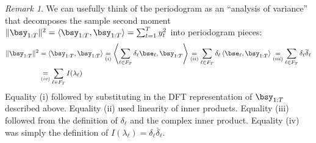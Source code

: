 \documentclass[12pt]{article}
\theoremstyle{plain}
\theoremstyle{definition}
\theoremstyle{remark}
\newtheorem*{rmk}{Remark}
\begin{document}
\begin{rmk}
We can usefully think of the periodogram as an ``analysis of variance''
that decomposes the sample second moment
$\lVert \bsy_{1:T}\rVert^2
=\langle \bsy_{1:T},\bsy_{1:T}\rangle
=\sum_{t=1}^T y_t^2$ into periodogram pieces:
\begin{align*}
  \lVert\bsy_{1:T}\rVert^2
  &= \langle \bsy_{1:T},\bsy_{1:T}\rangle
  \underset{(i)}{=}
  \left\langle \sum_{\ell \in F_T}\delta_\ell \bse_\ell,\bsy_{1:T}\right\rangle
  \underset{(ii)}{=}
  \sum_{\ell \in F_T}\delta_\ell \left\langle \bse_\ell,\bsy_{1:T}\right\rangle
  \underset{(iii)}{=}
  \sum_{\ell \in F_T}\delta_\ell \overline{\delta}_\ell
  \\
  &\underset{(iv)}{=}
  \sum_{\ell \in F_T}I(\lambda_\ell)
\end{align*}
Equality (i) followed by substituting in the DFT representation of
$\bsy_{1:T}$ described above.  Equality (ii) used linearity of inner
products. Equality (iii) followed from the definition of $\delta_\ell$
and the complex inner product. Equality (iv) was simply the definition
of $I(\lambda_\ell)=\delta_\ell\overline{\delta}_\ell$.
\end{rmk}
\end{document}
